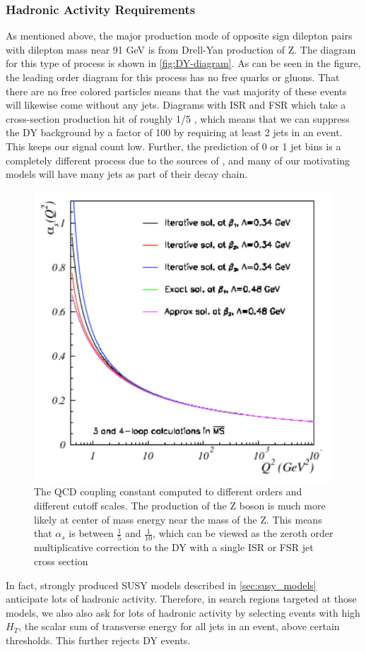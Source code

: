     \subsubsection{Hadronic Activity Requirements}
      As mentioned above, the major production mode of opposite sign dilepton pairs with dilepton mass near 91 GeV is from Drell-Yan production of Z. The diagram for this type of process is shown in \ref{fig:DY-diagram}. As can be seen in the figure, the leading order diagram for this process has no free quarks or gluons. That there are no free colored particles means that the vast majority of these events will likewise come without any jets. Diagrams with ISR and FSR which take a cross-section production hit of roughly 1/5 , which means that we can suppress the DY background by a factor of 100 by requiring at least 2 jets in an event. This keeps our signal count low. Further, the prediction of 0 or 1 jet bins is a completely different process due to the sources of \MET, and many of our motivating models will have many jets as part of their decay chain. 

      \begin{figure}[h!]
        \centering
        \includegraphics[width=.5\textwidth]{figures/QCD_Coupling_Running.pdf}
        \caption{The QCD coupling constant computed to different orders and different cutoff scales. The production of the Z boson is much more likely at center of mass energy near the mass of the Z. This means that $\alpha_s$ is between $\frac{1}{5}$ and $\frac{1}{10}$, which can be viewed as the zeroth order multiplicative correction to the DY with a single ISR or FSR jet cross section} 
        \label{fig:alpha_s_running}
      \end{figure}

      In fact, strongly produced SUSY models described in \ref{sec:susy_models} anticipate lots of hadronic activity. Therefore, in search regions targeted at those models, we also also ask for lots of hadronic activity by selecting events with high $H_T$, the scalar sum of transverse energy for all jets in an event, above certain thresholds. This further rejects DY events.

